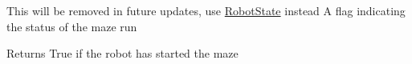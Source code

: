 
\begin{DoxyRefList}
\item[\label{deprecated__deprecated000001}%
\hypertarget{deprecated__deprecated000001}{}%
Member \hyperlink{class_robot_a97be7246df827ec139a2b2d69d25bad8}{Robot\-:\-:is\-Started} ()]This will be removed in future updates, use \hyperlink{namespace_robot_state_a35861cd80d5e6a7efe93588700256f40}{Robot\-State} instead A flag indicating the status of the maze run \begin{DoxyReturn}{Returns}
True if the robot has started the maze 
\end{DoxyReturn}

\end{DoxyRefList}